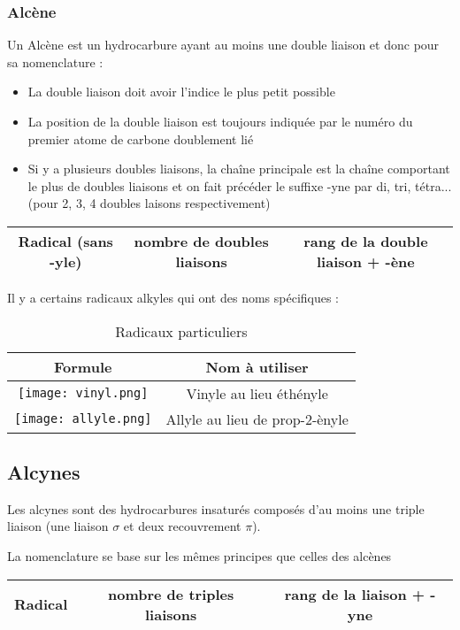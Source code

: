 \documentclass[a4paper, oneside]{book}
\begin{document}
\subsubsection{Alcène}
Un Alcène est un hydrocarbure ayant au moins une double liaison et donc pour sa nomenclature :\\
\begin{itemize}
    \item La double liaison doit avoir l'indice le plus petit possible
    \item La position de la double liaison est toujours indiquée par le numéro du premier atome de carbone doublement lié
    \item Si y a plusieurs doubles liaisons, la chaîne principale est la chaîne comportant le plus de doubles liaisons et on fait précéder le suffixe -yne par di, tri, tétra... (pour 2, 3, 4 doubles laisons respectivement)
\end{itemize}
\begin{center}
    \begin{tabular}{|c|c|c|}
        \hline
         \textbf{Radical (sans -yle) }  & \textbf{nombre de doubles liaisons} & \textbf{rang de la double liaison + -ène} \\
         \hline
    \end{tabular}
\end{center}
Il y a certains radicaux alkyles qui ont des noms spécifiques :
\begin{table}[h]
    \centering
    \begin{tabular}{|c|c|}
        \hline
        \textbf{Formule} & \textbf{Nom à utiliser}  \\
        \hline
        \texttt{[image: vinyl.png]} & Vinyle au lieu éthényle \\
        \hline
        \texttt{[image: allyle.png]} & Allyle au lieu de prop-2-ènyle \\
        \hline
    \end{tabular}
    \caption{Radicaux particuliers}
    \label{tab:my_label}
\end{table}
\subsection{Alcynes}
Les alcynes sont des hydrocarbures insaturés composés d'au moins une triple liaison (une liaison $\sigma$ et deux recouvrement $\pi$).

La nomenclature se base sur les mêmes principes que celles des alcènes
\begin{center}
    \begin{tabular}{|c|c|c|}
    \hline
    \textbf{Radical}  & \textbf{nombre de triples liaisons} & \textbf{rang de la  liaison + -yne} \\
    \hline
    \end{tabular}
\end{center}
\end{document}
